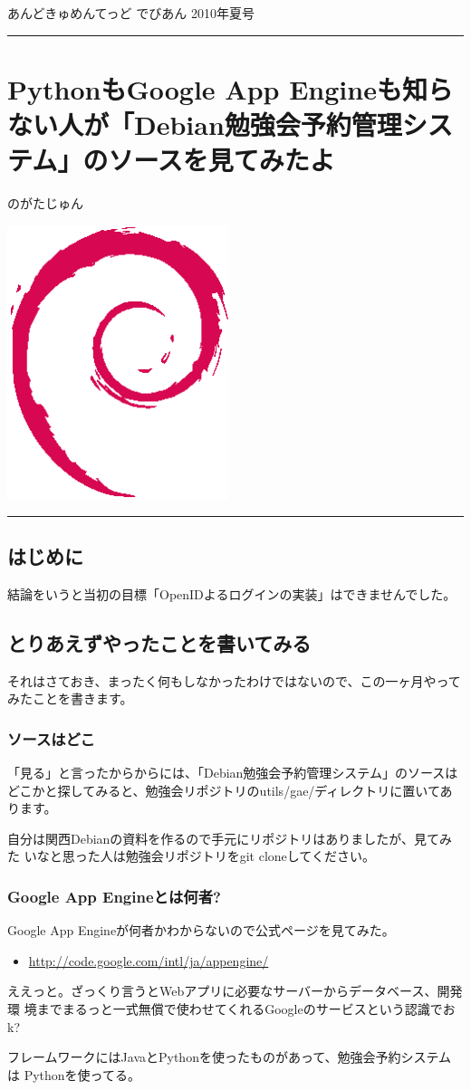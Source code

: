 \documentclass[mingoth,a4paper]{jsarticle}
\renewcommand{\dancersection}[2]{%
\newpage
あんどきゅめんてっど でびあん 2010年夏号
%
\vspace{0.1mm}\\
{\color{dancerlightblue}\rule{\hsize}{2mm}}

%
%
\begin{minipage}[t]{0.6\hsize}
\color{dancerdarkblue}
\vspace{1cm}
\section{#1}
\hfill{}#2\\
\end{minipage}
\begin{minipage}[t]{0.4\hsize}
\vspace{-2cm}
\hfill{}\includegraphics[height=8cm]{image200502/openlogo-nd.eps}\\
\vspace{-5cm}
\end{minipage}
%
%
{\color{dancerdarkblue}\rule{0.74\hsize}{2mm}}
%
\vspace{2cm}
}
\begin{document}
\dancersection{PythonもGoogle App Engineも知らない人が「Debian勉強会予約管理システム」のソースを見てみたよ}{のがたじゅん}

\subsection{はじめに}

結論をいうと当初の目標「OpenIDよるログインの実装」はできませんでした。

\subsection{とりあえずやったことを書いてみる}

それはさておき、まったく何もしなかったわけではないので、この一ヶ月やって
みたことを書きます。

\subsubsection{ソースはどこ}

「見る」と言ったからからには、「Debian勉強会予約管理システム」のソースは
どこかと探してみると、勉強会リポジトリのutils/gae/ディレクトリに置いてあ
ります。

自分は関西Debianの資料を作るので手元にリポジトリはありましたが、見てみた
いなと思った人は勉強会リポジトリをgit cloneしてください。


\subsubsection{Google App Engineとは何者?}

Google App Engineが何者かわからないので公式ページを見てみた。

\begin{itemize}
 \item \url{http://code.google.com/intl/ja/appengine/}
\end{itemize}

ええっと。ざっくり言うとWebアプリに必要なサーバーからデータベース、開発環
境までまるっと一式無償で使わせてくれるGoogleのサービスという認識でおk?

フレームワークにはJavaとPythonを使ったものがあって、勉強会予約システムは
Pythonを使ってる。
\end{document}
